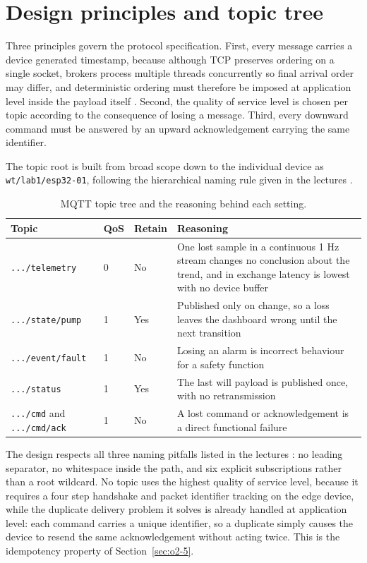 \section{Design principles and topic tree}
\label{sec:o4-1}

Three principles govern the protocol specification. First, every message carries a device generated timestamp, because although TCP preserves ordering on a single socket, brokers process multiple threads concurrently so final arrival order may differ, and deterministic ordering must therefore be imposed at application level inside the payload itself \cite{slide03}. Second, the quality of service level is chosen per topic according to the consequence of losing a message. Third, every downward command must be answered by an upward acknowledgement carrying the same identifier.

The topic root is built from broad scope down to the individual device as \texttt{wt/lab1/esp32-01}, following the hierarchical naming rule given in the lectures \cite{slide03}.

\begin{table}[H]
\caption{MQTT topic tree and the reasoning behind each setting.}
\label{tab:topic}
\centering
\renewcommand{\arraystretch}{1.1}
\begin{tabular}{|p{2.8cm}|p{0.8cm}|p{1.3cm}|p{7.5cm}|}
\hline
\textbf{Topic} & \textbf{QoS} & \textbf{Retain} & \textbf{Reasoning} \\
\hline
\texttt{.../telemetry} & 0 & No & One lost sample in a continuous 1 Hz stream changes no conclusion about the trend, and in exchange latency is lowest with no device buffer \\
\hline
\texttt{.../state/pump} & 1 & Yes & Published only on change, so a loss leaves the dashboard wrong until the next transition \\
\hline
\texttt{.../event/fault} & 1 & No & Losing an alarm is incorrect behaviour for a safety function \\
\hline
\texttt{.../status} & 1 & Yes & The last will payload is published once, with no retransmission \\
\hline
\texttt{.../cmd} and \texttt{.../cmd/ack} & 1 & No & A lost command or acknowledgement is a direct functional failure \\
\hline
\end{tabular}
\end{table}

The design respects all three naming pitfalls listed in the lectures \cite{slide03}: no leading separator, no whitespace inside the path, and six explicit subscriptions rather than a root wildcard. No topic uses the highest quality of service level, because it requires a four step handshake and packet identifier tracking on the edge device, while the duplicate delivery problem it solves is already handled at application level: each command carries a unique identifier, so a duplicate simply causes the device to resend the same acknowledgement without acting twice. This is the idempotency property of Section~\ref{sec:o2-5}.

